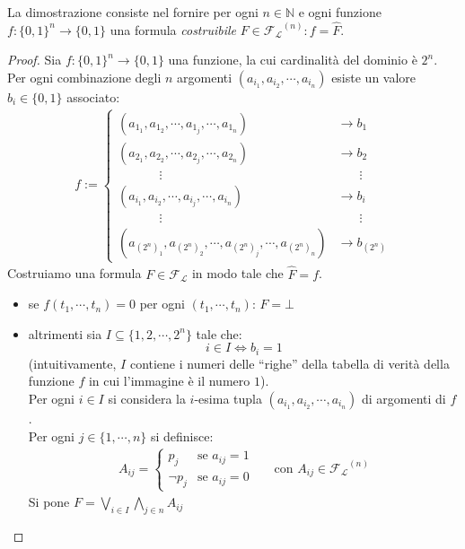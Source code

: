 La dimostrazione consiste nel fornire per ogni $n \in \mathbb{N}$ e ogni funzione $f: \{0,1\}^{n} \rightarrow \{0,1\}$ una formula \textit{costruibile} $F \in \mathscr{F_L}^{(n)} : f = \hat F$. 
\begin{proof}
Sia $f: \{0,1\}^{n} \rightarrow \{0,1\}$ una funzione, la cui cardinalità del dominio è $2^{n}$. Per ogni combinazione degli $n$ argomenti $(a_{i_1}, a_{i_2}, \cdots, a_{i_n})$ esiste un valore $b_i \in \{0,1\}$ associato:
\begin{align}
  f :=
  \begin{cases}
    (a_{1_1}, a_{1_2}, \cdots, a_{1_j}, \cdots, a_{1_n}) & \longrightarrow b_1 \\
    (a_{2_1}, a_{2_2}, \cdots, a_{2_j}, \cdots, a_{2_n}) & \longrightarrow b_2 \\
    ~~~~~~~~~~~~~~~     \vdots           & ~~~~~~~~ \vdots \\
    (a_{i_1}, a_{i_2}, \cdots, a_{i_j}, \cdots, a_{i_n}) & \longrightarrow b_i \\
    ~~~~~~~~~~~~~~~     \vdots           & ~~~~~~~~ \vdots \\
    (a_{(2^n)_1}, a_{(2^n)_2}, \cdots, a_{(2^n)_j}, \cdots, a_{(2^n)_n}) & \longrightarrow b_{(2^n)}
  \end{cases}
\end{align}
Costruiamo una formula $F \in \mathscr{F_L}$ in modo tale che $ \hat{F} = f$.
\begin{itemize}
  \item se $f(t_1, \cdots, t_n) = 0$ per ogni $(t_1, \cdots, t_n)$: $F = \bot$
  \item altrimenti sia $I \subseteq \{1, 2, \cdots, 2^{n}\}$ tale che:
  $$
  i \in I \iff b_i = 1
  $$
  (intuitivamente, $I$ contiene i numeri delle ``righe'' della tabella di verità della funzione $f$ in cui l'immagine è il numero $1$). \\
  Per ogni $i \in I$ si considera la $i$-esima tupla $(a_{i_1}, a_{i_2}, \cdots, a_{i_n})$ di argomenti di $f$. \\
  Per ogni $j \in \{1, \cdots, n\}$ si definisce:
  \begin{align*}
  A_{ij} =
  \begin{cases}
    p_j & \text{se } a_{ij} = 1 \\
    \neg p_j & \text{se } a_{ij} = 0
  \end{cases} &&
  \text{con } A_{ij} \in \mathscr{F_L}^{(n)}
  \end{align*}
  Si pone $F = \bigvee\limits_{i \in I}\bigwedge\limits_{j \in n} A_{ij}$
  

\end{itemize}
\end{proof}
